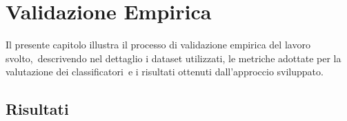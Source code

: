 \chapter{Validazione Empirica}

Il presente capitolo illustra il processo di validazione empirica del lavoro svolto,\
descrivendo nel dettaglio i dataset utilizzati, le metriche adottate per la valutazione dei classificatori\
e i risultati ottenuti dall'approccio sviluppato.





\section{Risultati}
